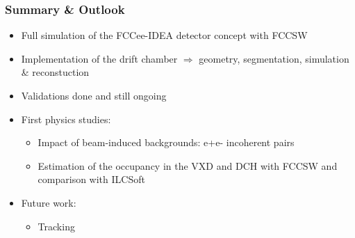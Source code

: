 \documentclass[hyperref={colorlinks=true,pdfpagelabels=false,linkcolor=black}, xcolor=dvipsnames,10pt]{beamer}
\begin{document}
\label{lastslide}
\begin{frame}
  \frametitle{Summary \& Outlook}
  
	\begin{itemize}
	\item Full simulation of the FCCee-IDEA detector concept with FCCSW
	\item Implementation of the drift chamber 
		$\Rightarrow$ geometry, segmentation, simulation \& reconstuction
	\item Validations done and still ongoing 
	\item First physics studies:
		\begin{itemize}
		\item Impact of beam-induced backgrounds: e+e- incoherent pairs
	  	\item Estimation of the occupancy in the VXD and DCH with FCCSW and comparison with ILCSoft
	  	\end{itemize}
	\item Future work:
		\begin{itemize}
		\item Tracking
		\end{itemize}
  	\end{itemize}

\end{frame}
\end{document}
